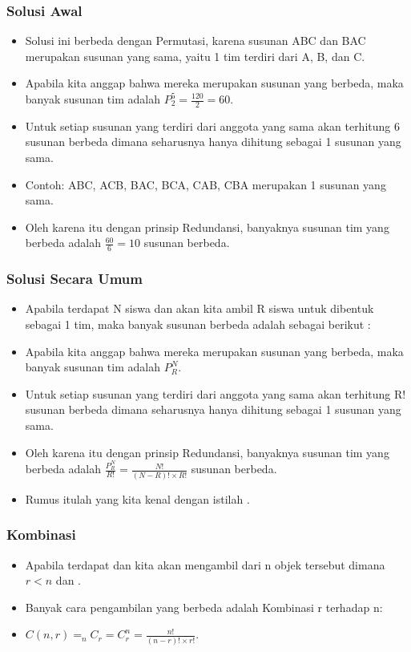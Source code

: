 \begin{frame}
\frametitle{Solusi Awal}
\begin{itemize}
  \item Solusi ini berbeda dengan Permutasi, karena susunan ABC dan BAC merupakan susunan yang sama, yaitu 1 tim terdiri dari A, B, dan C.
  \item Apabila kita anggap bahwa mereka merupakan susunan yang berbeda, maka banyak susunan tim adalah $P^{5}_{2} = \frac{120}{2} = 60$.
  \item Untuk setiap susunan yang terdiri dari anggota yang sama akan terhitung 6 susunan berbeda dimana seharusnya hanya dihitung sebagai 1 susunan yang sama.
  \item Contoh: ABC, ACB, BAC, BCA, CAB, CBA merupakan 1 susunan yang sama.
  \item Oleh karena itu dengan prinsip Redundansi, banyaknya susunan tim yang berbeda adalah $\frac{60}{6} = 10$ susunan berbeda.
\end{itemize}
\end{frame}

\begin{frame}
\frametitle{Solusi Secara Umum}
\begin{itemize}
  \item Apabila terdapat N siswa dan akan kita ambil R siswa untuk dibentuk sebagai 1 tim, maka banyak susunan berbeda adalah sebagai berikut :
  \item Apabila kita anggap bahwa mereka merupakan susunan yang berbeda, maka banyak susunan tim adalah $P^{N}_{R}$.
  \item Untuk setiap susunan yang terdiri dari anggota yang sama akan terhitung R! susunan berbeda dimana seharusnya hanya dihitung sebagai 1 susunan yang sama.
  \item Oleh karena itu dengan prinsip Redundansi, banyaknya susunan tim yang berbeda adalah $\frac{P^{N}_{R}}{R!} = \frac{N!}{(N-R)! \times R!}$ susunan berbeda.
  \item Rumus itulah yang kita kenal dengan istilah .
\end{itemize}
\end{frame}

\begin{frame}
\frametitle{Kombinasi}
\begin{itemize}
  \item Apabila terdapat  dan kita akan mengambil  dari n objek tersebut dimana $r<n$ dan .
  \item Banyak cara pengambilan yang berbeda adalah Kombinasi r terhadap n: 
  \item $C(n,r) = _{n}C_{r} = C^{n}_{r} = \frac{n!}{(n-r)! \times r!}$.
\end{itemize}
\end{frame}

